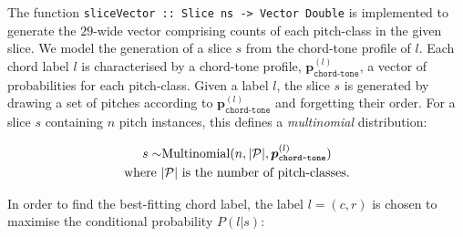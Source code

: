 \documentclass[12pt,a4paper,twoside,openany]{report} \usepackage[pdfborder={0 0 0}]{hyperref}    %
\theoremstyle{definition} \newtheorem{definition}{Definition}[section]
\begin{document}
    The function \texttt{sliceVector :: Slice ns -> Vector Double} is implemented to generate the $29$-wide vector comprising counts of
    each pitch-class in the given slice.
    We model the generation of a slice $s$ from the chord-tone profile of $l$. 
    Each chord label $l$ is characterised by a chord-tone profile,
    $\textbf{p}^{(l)}_{\texttt{chord-tone}}$, a vector of probabilities for each pitch-class. Given a label $l$, the slice $s$ is
    generated by drawing a set of pitches according to $\textbf{p}^{(l)}_{\texttt{chord-tone}}$ and forgetting their order. 
    For a slice $s$ containing $n$ pitch instances, this defines a \textit{multinomial} distribution: 

    \begin{equation} 
      \begin{gathered}
      s \sim $Multinomial$(n, |\mathcal{P}|,\bm{p}^{(l)}_{\texttt{chord-tone}}) \\ 
      $where $ |\mathcal{P}|  $ is the number of pitch-classes.$
      \end{gathered} 
       \label{eq:sliceModel} 
     \end{equation}

    In order to find the best-fitting chord label, the label $l=(c,r)$ is chosen to maximise the conditional probability
    $P(l|s)$:
\end{document}
